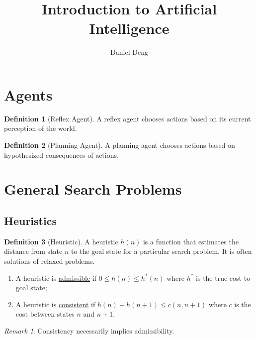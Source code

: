 \documentclass[11pt]{article}
\title{Introduction to Artificial Intelligence}
\author{Daniel Deng}
\date{}
\theoremstyle{definition}
\newtheorem{definition}{Definition}[section]
\theoremstyle{remark}
\newtheorem*{remark}{Remark}
\begin{document}
\maketitle

\section{Agents}
\begin{definition}[Reflex Agent]
A reflex agent chooses actions based on its current perception of the world.
\end{definition}

\begin{definition}[Planning Agent]
A planning agent chooses actions based on hypothesized consequences of actions.
\end{definition}
\clearpage

\section{General Search Problems}
\subsection{Heuristics}
\begin{definition}[Heuristic] 
A heuristic $h(n)$ is a function that estimates the distance from state $n$ to the goal state for a particular search problem. It is often solutions of relaxed problems.
\begin{enumerate}
\item A heuristic is \underline{admissible} if $0 \leq h(n) \leq h^*(n)$ where $h^*$ is the true cost to goal state;
\item A heuristic is \underline{consistent} if $h(n) - h(n+1) \leq c(n, n+1)$ where $c$ is the cost between states $n$ and $n+1$.
\end{enumerate}
\end{definition}
\begin{remark}
Consistency necessarily implies admissibility.
\end{remark}
\end{document}
